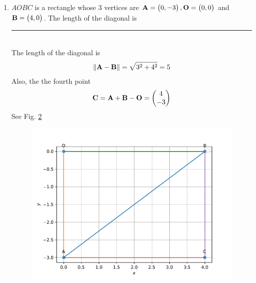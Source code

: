 \documentclass[journal,12pt,twocolumn]{IEEEtran}
\begin{document}
\begin{enumerate}
\begin{figure}
	  \caption{}
	  \label{fig:matrix-10-5.pdf}
	  \end{figure}
  \item $AOBC$ is a rectangle whose 3 vertices are $\mathbf{A} = \begin{pmatrix}0,-3\end{pmatrix}, \mathbf{O} = \begin{pmatrix}0,0\end{pmatrix}$ and $\mathbf{B} = \begin{pmatrix}4,0\end{pmatrix}$. The length of the diagonal is \rule{1.5cm}{0.15mm}\\
\solution
The length of the diagonal is  
  \begin{align}
	  \left\lVert\mathbf{A}-\mathbf{B}\right\rVert = \sqrt{3^2+4^2} = 5
  \end{align}
  Also, the the fourth point 
  \begin{align}
	\mathbf{C} = \mathbf{A}+ \mathbf{B}-\mathbf{O} = \begin{pmatrix}4 \\ -3\end{pmatrix}
  \end{align}
    See Fig. 
	  \ref{fig:matrix-10-6.pdf}
  \begin{figure}
	  \centering 
	  \includegraphics[width=\columnwidth]{figs/matrix-10-6.pdf}
	  \caption{}
	  \label{fig:matrix-10-6.pdf}
	  \end{figure}
    


\end{enumerate}
\end{document}
